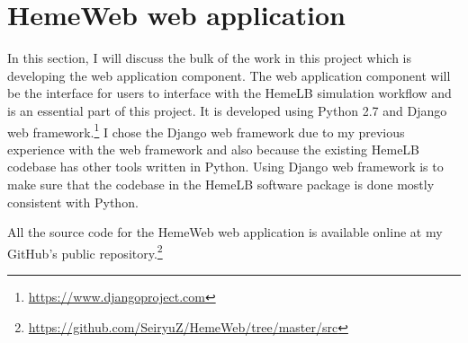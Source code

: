 \section{HemeWeb web application}

In this section, I will discuss the bulk of the work in this project which is developing the web application component. The web application component will be the interface for users to interface with the HemeLB simulation workflow and is an essential part of this project. It is developed using Python 2.7 and Django web framework.\footnote{\url{https://www.djangoproject.com}} I chose the Django web framework due to my previous experience with the web framework and also because the existing HemeLB codebase has other tools written in Python. Using Django web framework is to make sure that the codebase in the HemeLB software package is done mostly consistent with Python. 

All the source code for the HemeWeb web application is available online at my GitHub's public repository.\footnote{\url{https://github.com/SeiryuZ/HemeWeb/tree/master/src}}



